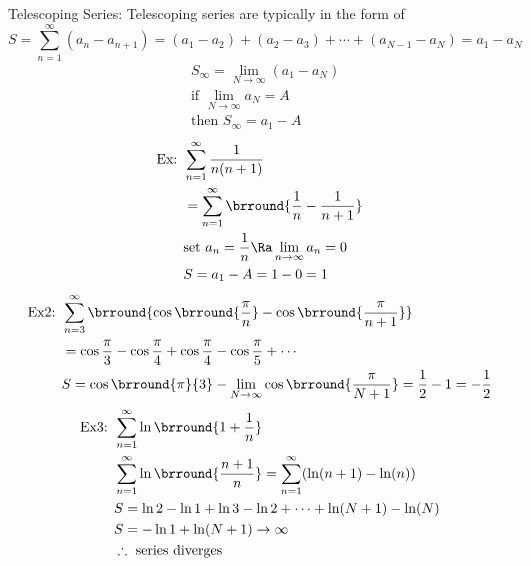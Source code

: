 Telescoping Series:
Telescoping series are typically in the form of
$$S=\sum_{n=1}^\infty(a_n-a_{n+1})=(a_1-a_2)+(a_2-a_3)+\cdots+(a_{N-1}-a_N)=a_1-a_N$$
\begin{align*}
    &S_\infty=\lim_{N\to\infty}(a_1-a_N)\\
    &\text{if }\lim_{N\to\infty}a_N=A\\
    &\text{then }S_\infty=a_1-A
\end{align*}
\begin{align*}
    \text{Ex: }&\sum_{n=1}^\infty\frac{1}{n(n+1)}\\
    &=\sum_{n=1}^\infty\brround{\frac{1}{n}-\frac{1}{n+1}}\\
    &\text{set }a_n=\frac{1}{n}\Ra \lim_{n\to\infty}a_n=0\\
    &S=a_1-A=1-0=1
\end{align*}
\begin{align*}
    \text{Ex2: }&\sum_{n=3}^\infty\brround{\cos\brround{\frac{\pi}{n}}-\cos\brround{\frac{\pi}{n+1}}}\\
    &=\cos\frac{\pi}{3}-\cos\frac{\pi}{4}+\cos\frac{\pi}{4}-\cos\frac{\pi}{5}+\cdots\\
    &S=\cos\brround{\pi}{3}-\lim_{N\to\infty}\cos\brround{\frac{\pi}{N+1}}=\frac{1}{2}-1=-\frac{1}{2}
\end{align*}
\begin{align*}
    \text{Ex3: }&\sum_{n=1}^\infty\ln\brround{1+\frac{1}{n}}\\
    &\sum_{n=1}^\infty\ln\brround{\frac{n+1}{n}}=\sum_{n=1}^\infty(\ln(n+1)-\ln(n))\\
    &S=\ln2-\ln1+\ln3-\ln2+\cdots+\ln(N+1)-\ln(N)\\
    &S=-\ln1+\ln(N+1)\to\infty\\
    &\therefore \text{ series diverges}
\end{align*}

